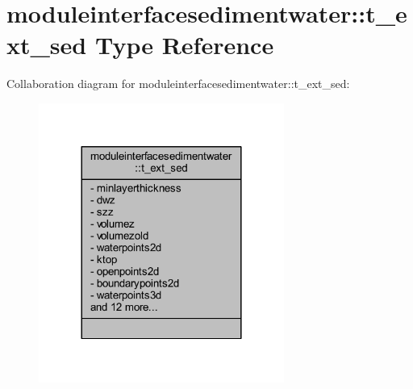 \hypertarget{structmoduleinterfacesedimentwater_1_1t__ext__sed}{}\section{moduleinterfacesedimentwater\+:\+:t\+\_\+ext\+\_\+sed Type Reference}
\label{structmoduleinterfacesedimentwater_1_1t__ext__sed}


Collaboration diagram for moduleinterfacesedimentwater\+:\+:t\+\_\+ext\+\_\+sed\+:\nopagebreak
\begin{figure}[H]
\begin{center}
\leavevmode
\includegraphics[width=228pt]{structmoduleinterfacesedimentwater_1_1t__ext__sed__coll__graph}
\end{center}
\end{figure}

